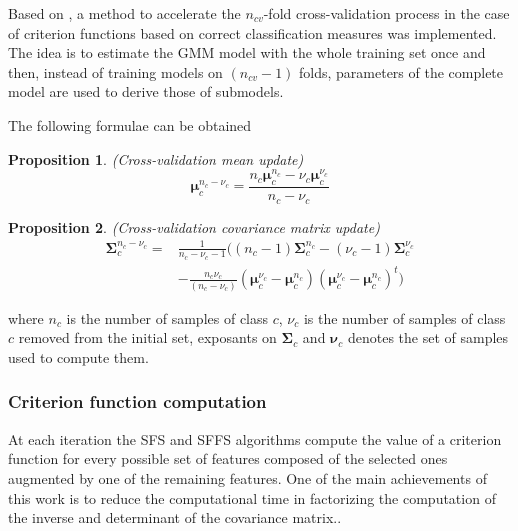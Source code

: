 \documentclass[journal,peerreview,onecolumn]{IEEEtran}
\newtheorem{prop}{Proposition}
\begin{document}
        Based on \cite{fauvel2015fast}, a method to accelerate the $n_{cv}$-fold cross-validation process in the case of criterion functions based on correct classification measures was implemented. The idea is to estimate the GMM model with the whole training set once and then, instead of training models on $(n_{cv}-1)$ folds, parameters of the complete model are used to derive those of submodels.

        The following formulae can be obtained
        \begin{prop}
            \label{eq:update-cv1}
            (Cross-validation mean update)
            \begin{equation*}
                \boldsymbol{\mu}_c^{n_c-\nu_c} = \frac{n_c \boldsymbol{\mu}_c^{n_c} - \nu_c \boldsymbol{\mu}_c^{\nu_c}}{n_c - \nu_c} \nonumber
            \end{equation*}
        \end{prop}
        \begin{prop}
            \label{eq:update-cv2}
            (Cross-validation covariance matrix update)
            \begin{align*}
                \boldsymbol{\Sigma}_c^{n_c-\nu_c} = &\frac{1}{n_c-\nu_c-1} \biggl( (n_c-1) \boldsymbol{\Sigma}_c^{n_c} - (\nu_c-1) \boldsymbol{\Sigma}_c^{\nu_c} \nonumber \\
                &- \frac{n_c \nu_c}{(n_c-\nu_c)} (\boldsymbol{\mu}_c^{\nu_c}-\boldsymbol{\mu}_c^{n_c})(\boldsymbol{\mu}_c^{\nu_c}-\boldsymbol{\mu}_c^{n_c})^t \biggr) \nonumber
            \end{align*}
        \end{prop}
        where $n_c$ is the number of samples of class $c$, $\nu_c$ is the number of samples of class $c$ removed from the initial set, exposants on $\boldsymbol{\Sigma}_c$ and $\boldsymbol{\nu}_c$ denotes the set of samples used to compute them.

        \subsubsection{Criterion function computation}
        \label{sec:update-crit}

        At each iteration the SFS and SFFS algorithms compute the value of a criterion function for every possible set of features composed of the selected ones augmented by one of the remaining features. One of the main achievements of this work is to reduce the computational time in factorizing the computation of the inverse and determinant of the covariance matrix..
\end{document}
